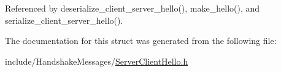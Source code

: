 Referenced by deserialize\+\_\+client\+\_\+server\+\_\+hello(), make\+\_\+hello(), and serialize\+\_\+client\+\_\+server\+\_\+hello().



The documentation for this struct was generated from the following file\+:\begin{DoxyCompactItemize}
\item 
include/\+Handshake\+Messages/\hyperlink{_server_client_hello_8h}{Server\+Client\+Hello.\+h}\end{DoxyCompactItemize}
